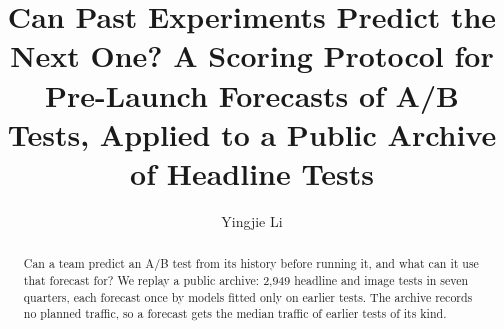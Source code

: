 \documentclass[sigconf,nonacm]{acmart}
\begin{document}
\title{Can Past Experiments Predict the Next One? A Scoring Protocol for Pre-Launch Forecasts of A/B Tests, Applied to a Public Archive of Headline Tests}

\author{Yingjie Li}

\begin{abstract}
Can a team predict an A/B test from its history before running it, and what can it use that forecast for? We replay a public archive: 2,949 headline and image tests in seven quarters, each forecast once by models fitted only on earlier tests. The archive records no planned traffic, so a forecast gets the median traffic of earlier tests of its kind.


\end{abstract}
\end{document}
